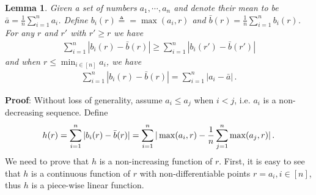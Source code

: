 \documentclass[11pt]{article}
\newtheorem{lemma}{Lemma}
\begin{document}
\begin{lemma}\label{lem: mean_after_max}
	Given  a set of numbers $a_1,\cdots,a_n$ and denote their mean to be $\bar a = \frac{1}{n}\sum_{i=1}^n a_i$. Define $b_i(r) \triangleq = \max(a_i,r)$ and $\bar b (r) =  \frac{1}{n}\sum_{i=1}^n b_i(r)$. For any $r$ and $r'$ with $r' \geq r$ we have 
	\begin{align}\label{eq: r_decrease}
	\sum_{i=1}^n |b_i(r) - \bar b(r)| \geq \sum_{i=1}^n |b_i(r') - \bar b(r')|
	\end{align}
	and when $r \leq \min_{i \in [n]} a_i$, we have
	\begin{align}\label{eq: r_reduce}
	\sum_{i=1}^n |b_i(r) - \bar b(r)| =   \sum_{i=1}^n |a_i - \bar a| \, .
	\end{align}
\end{lemma}

{ \textbf{Proof}:}
Without loss of generality, assume $a_i \leq a_j$ when $i < j$, i.e. $a_i$ is a non-decreasing sequence. Define 
\begin{align}\notag
h(r) = \sum_{i=1}^n |b_i(r) - \bar b(r)| = \sum_{i=1}^n |\max (a_i,r) - \frac{1}{n}\sum_{j=1}^n \max(a_j,r)|\, .
\end{align}
We need to prove that $h$ is a non-increasing function of $r$. 
First,
it is easy to see that $h$ is a continuous function of $r$ with non-differentiable points $r = a_i, i \in [n]$, thus $h$ is a piece-wise linear function.
\end{document}
